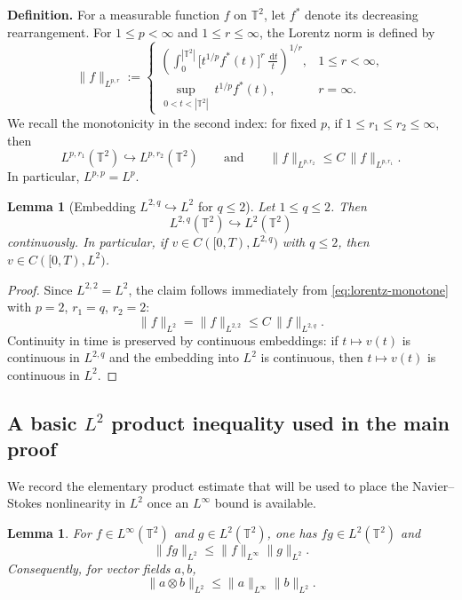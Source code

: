\documentclass[12pt]{article}
\newcommand{\T}{\mathbb{T}}
\newcommand{\dd}{\,\mathrm{d}}
\newtheorem{lemma}[theorem]{Lemma}
\theoremstyle{remark}
\theoremstyle{remark}
\begin{document}
\medskip

\noindent\textbf{Definition.}
For a measurable function $f$ on $\T^2$, let $f^\ast$ denote its decreasing rearrangement. For
$1\le p<\infty$ and $1\le r\le\infty$, the Lorentz norm is defined by
\[
\|f\|_{L^{p,r}}
:=
\begin{cases}
\displaystyle
\left(\int_0^{|\T^2|}\bigl[t^{1/p}f^\ast(t)\bigr]^r\,\frac{\dd t}{t}\right)^{1/r}, & 1\le r<\infty,\\[2.0ex]
\displaystyle
\sup_{0<t<|\T^2|}\ t^{1/p}f^\ast(t), & r=\infty.
\end{cases}
\]
We recall the monotonicity in the second index: for fixed $p$, if $1\le r_1\le r_2\le\infty$, then
\begin{equation}\label{eq:lorentz-monotone}
L^{p,r_1}(\T^2)\hookrightarrow L^{p,r_2}(\T^2)
\qquad\text{and}\qquad
\|f\|_{L^{p,r_2}}\le C\,\|f\|_{L^{p,r_1}}.
\end{equation}
In particular, $L^{p,p}=L^p$.

\begin{lemma}[Embedding $L^{2,q}\hookrightarrow L^2$ for $q\le 2$]\label{lem:L2q-into-L2}
Let $1\le q\le 2$. Then
\[
L^{2,q}(\T^2)\hookrightarrow L^2(\T^2)
\]
continuously. In particular, if $v\in C([0,T),L^{2,q})$ with $q\le 2$, then $v\in C([0,T),L^2)$.
\end{lemma}

\begin{proof}
Since $L^{2,2}=L^2$, the claim follows immediately from \eqref{eq:lorentz-monotone} with $p=2$,
$r_1=q$, $r_2=2$:
\[
\|f\|_{L^2}=\|f\|_{L^{2,2}}\le C\,\|f\|_{L^{2,q}}.
\]
Continuity in time is preserved by continuous embeddings: if $t\mapsto v(t)$ is continuous in
$L^{2,q}$ and the embedding into $L^2$ is continuous, then $t\mapsto v(t)$ is continuous in $L^2$.
\end{proof}

\subsection{A basic $L^2$ product inequality used in the main proof}

We record the elementary product estimate that will be used to place the Navier--Stokes nonlinearity
in $L^2$ once an $L^\infty$ bound is available.

\begin{lemma}\label{lem:Linfty-L2}
For $f\in L^\infty(\T^2)$ and $g\in L^2(\T^2)$, one has $fg\in L^2(\T^2)$ and
\[
\|fg\|_{L^2}\le \|f\|_{L^\infty}\|g\|_{L^2}.
\]
Consequently, for vector fields $a,b$,
\[
\|a\otimes b\|_{L^2}\le \|a\|_{L^\infty}\|b\|_{L^2}.
\]
\end{lemma}
\end{document}
